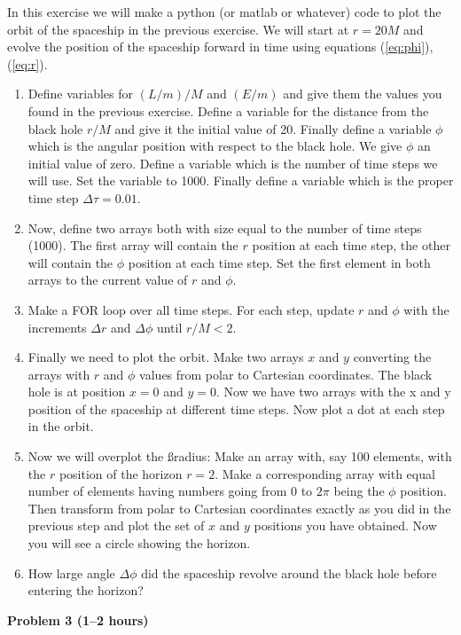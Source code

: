 \begin{multicols}{2}
In this exercise we will make a python (or matlab or whatever) code to plot the orbit of the spaceship in the previous exercise. We will start at $r=20M$ and evolve the position of the spaceship forward in time using equations (\ref{eq:phi}), (\ref{eq:r}).
\begin{enumerate}
\item Define variables for $(L/m)/M$ and $(E/m)$ and give them the values you found in the previous exercise. Define a variable for the distance from the black hole $r/M$ and give it the initial value of 20. Finally define a variable $\phi$ which is the angular position with respect to the black hole. We give $\phi$ an initial value of zero. Define a variable which is the number of time steps we will use. Set the variable to 1000. Finally define a variable which is the proper time step $\Delta\tau=0.01$. 
\item Now, define two arrays both with size equal to the number of time steps (1000). The first array will contain the $r$ position at each time step, the other will contain the $\phi$ position at each time step. Set the first element in both arrays to the current value of $r$ and $\phi$.
\item Make a FOR loop over all time steps. For each step, update $r$ and $\phi$ with the increments $\Delta r$ and $\Delta\phi$ until $r/M<2$.
\item Finally we need to plot the orbit. Make two arrays $x$ and $y$ converting the arrays with $r$ and $\phi$ values from polar to Cartesian coordinates. The black hole is at position $x=0$ and $y=0$. Now we have two arrays with the x and y position of the spaceship at different time steps. Now plot a dot at each step in the orbit.
\item Now we will overplot the \ss radius: Make an array with, say 100 elements, with the $r$ position of the horizon $r=2$. Make a corresponding array with equal number of elements having numbers going from 0 to $2\pi$ being the $\phi$ position. Then transform from polar to Cartesian coordinates exactly as you did in the previous step and plot the set of $x$ and $y$ positions you have obtained. Now you will see a circle showing the horizon. 
\item How large angle $\Delta\phi$ did the spaceship revolve around the black hole before entering the horizon?
\end{enumerate}

\vspace{0.5cm}

{\bf Problem 3 (1--2 hours)}


\end{multicols}
